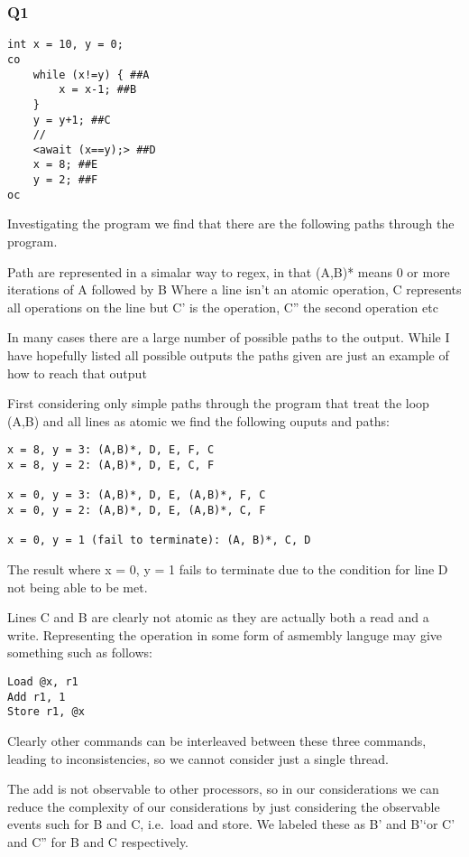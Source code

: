 \subsubsection{Q1}

\begin{verbatim}
int x = 10, y = 0;
co
    while (x!=y) { ##A
        x = x-1; ##B
    }
    y = y+1; ##C
    //
    <await (x==y);> ##D
    x = 8; ##E
    y = 2; ##F
oc
\end{verbatim}

Investigating the program we find that there are the following paths
through the program.

Path are represented in a simalar way to regex, in that (A,B)* means 0
or more iterations of A followed by B Where a line isn't an atomic
operation, C represents all operations on the line but C' is the
operation, C'' the second operation etc

In many cases there are a large number of possible paths to the output.
While I have hopefully listed all possible outputs the paths given are
just an example of how to reach that output

First considering only simple paths through the program that treat the
loop (A,B) and all lines as atomic we find the following ouputs and
paths:

\begin{verbatim}
x = 8, y = 3: (A,B)*, D, E, F, C
x = 8, y = 2: (A,B)*, D, E, C, F

x = 0, y = 3: (A,B)*, D, E, (A,B)*, F, C
x = 0, y = 2: (A,B)*, D, E, (A,B)*, C, F

x = 0, y = 1 (fail to terminate): (A, B)*, C, D
\end{verbatim}

The result where x = 0, y = 1 fails to terminate due to the condition
for line D not being able to be met.

Lines C and B are clearly not atomic as they are actually both a read
and a write. Representing the operation in some form of asmembly languge
may give something such as follows:

\begin{verbatim}
Load @x, r1
Add r1, 1
Store r1, @x
\end{verbatim}

Clearly other commands can be interleaved between these three commands,
leading to inconsistencies, so we cannot consider just a single thread.

The add is not observable to other processors, so in our considerations
we can reduce the complexity of our considerations by just considering
the observable events such for B and C, i.e.~load and store. We labeled
these as B' and B'`or C' and C'' for B and C respectively.

